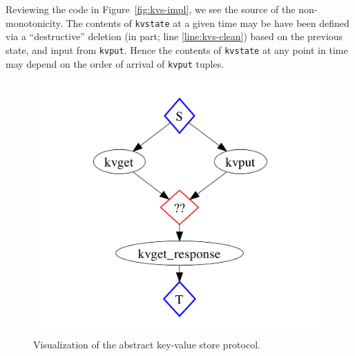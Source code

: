 Reviewing the code in Figure~\ref{fig:kvs-impl}, we see the source of the non-monotonicity.  
The contents of \texttt{kvstate} at a given time may be have been defined via a ``destructive'' deletion (in
part; line \ref{line:kvs-clean}) based on the previous state, and input from \texttt{kvput}.  Hence the contents of \texttt{kvstate} at
any point in time may depend on the order of arrival of \texttt{kvput} tuples.



\begin{figure}[t]
\centering
\includegraphics[width=0.8\linewidth]{fig/kvs_proto_pdg.pdf}
\vspace{-10pt}
\caption{Visualization of the abstract key-value store protocol.}
\label{fig:pdg-kvs-proto-analysis}
\vspace{-2pt}
\end{figure}

